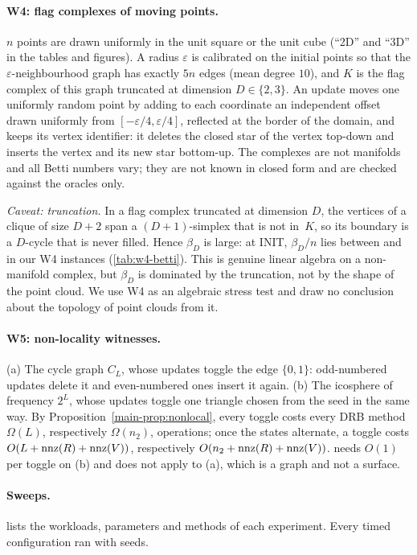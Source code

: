 \paragraph{W4: flag complexes of moving points.}
$n$ points are drawn uniformly in the unit square or the unit cube (``2D'' and
``3D'' in the tables and figures). A radius
$\varepsilon$ is calibrated on the initial points so that the
$\varepsilon$-neighbourhood graph has exactly $5n$ edges (mean degree $10$), and
$K$ is the flag complex of this graph truncated at dimension $D\in\{2,3\}$. An
update moves one uniformly random point by adding to each coordinate an
independent offset drawn uniformly from $[-\varepsilon/4,\varepsilon/4]$,
reflected at the border of the domain, and keeps its vertex identifier: it
deletes the closed star of the vertex top-down and inserts the vertex and its new
star bottom-up. The complexes are not manifolds and all Betti numbers vary; they
are not known in closed form and are checked against the oracles only.

\emph{Caveat: truncation.} In a flag complex truncated at dimension $D$, the
vertices of a clique of size $D+2$ span a $(D+1)$-simplex that is not in~$K$, so
its boundary is a $D$-cycle that is never filled. Hence $\beta_D$ is large: at
INIT, $\beta_D/n$ lies between \NumWFourBetaDRatioMin{} and
\NumWFourBetaDRatioMax{} in our W4 instances (\cref{tab:w4-betti}). This is genuine linear algebra on
a non-manifold complex, but $\beta_D$ is dominated by the truncation, not by the
shape of the point cloud. We use W4 as an algebraic stress test and draw no
conclusion about the topology of point clouds from it.

\paragraph{W5: non-locality witnesses.}
(a) The cycle graph $C_L$, whose updates toggle the edge $\{0,1\}$: odd-numbered
updates delete it and even-numbered ones insert it again. (b) The icosphere of
frequency $2^L$, whose updates toggle one triangle chosen from the seed in the
same way. By Proposition~\ref{main-prop:nonlocal}, every toggle costs every DRB method
$\Omega(L)$, respectively $\Omega(n_2)$, operations; once the states alternate,
a toggle costs $O(L+\operatorname{nnz}(R)+\operatorname{nnz}(V))$, respectively $O(n_2+\operatorname{nnz}(R)+\operatorname{nnz}(V))$.
 needs $O(1)$ per toggle on (b) and does not apply to (a), which
is a graph and not a surface.

\paragraph{Sweeps.}
 lists the workloads, parameters and methods of each
experiment. Every timed configuration ran with \NumSeeds{} seeds.

